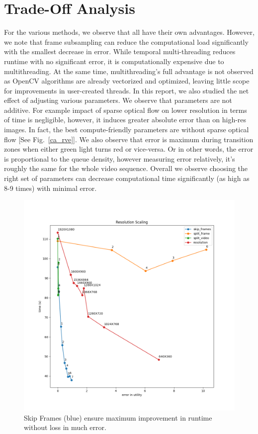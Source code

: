 \documentclass[conference]{IEEEtran}
\begin{document}
\section{Trade-Off Analysis}

For the various methods, we observe that all have their own advantages. However, we note that frame subsampling can reduce the computational load significantly with the smallest decrease in error.
While temporal multi-threading reduces runtime with no significant error, it is computationally expensive due to multithreading. At the same time, multithreading's full advantage is not
observed as OpenCV algorithms are already vectorized and optimized, leaving little scope for improvements in user-created threads.
In this report, we also studied the net effect of adjusting various parameters. We observe that parameters are not additive. For example impact of sparse optical flow on lower resolution in terms of time is negligible, however, it induces greater absolute error than on high-res images.
In fact, the best compute-friendly parameters are without sparse optical flow [See Fig.~\ref{ca_rve}].
We also observe that error is maximum during transition zones when either green light turns red or vice-versa. Or in other words, the error is proportional to the queue density, however measuring error relatively, it's roughly the same for the whole video sequence.
Overall we observe choosing the right set of parameters can decrease computational time significantly (as high as 8-9 times) with minimal error.


\begin{figure}[htbp]
    \centerline{\includegraphics[scale=0.3]{plots/plot_all.png}}
    \caption{Skip Frames (blue) ensure maximum improvement in runtime without loss in much error.}
    \label{plot_all}
\end{figure}
\end{document}
